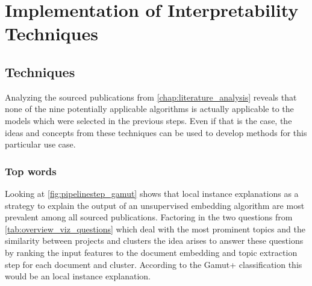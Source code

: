 %
\chapter{Implementation of Interpretability Techniques}
\label{chap:interpretability_techniques}

\section{Techniques}

Analyzing the sourced publications from \autoref{chap:literature_analysis} reveals that none of the nine potentially applicable algorithms is actually applicable to the models which were selected in the previous steps. Even if that is the case, the ideas and concepts from these techniques can be used to develop methods for this particular use case.

\subsection{Top words}

Looking at \autoref{fig:pipelinestep_gamut} shows that local instance explanations as a strategy to explain the output of an unsupervised embedding algorithm are most prevalent among all sourced publications. Factoring in the two questions from \autoref{tab:overview_viz_questions} which deal with the most prominent topics and the similarity between projects and clusters the idea arises to answer these questions by ranking the input features to the document embedding and topic extraction step for each document and cluster. According to the Gamut+ classification this would be an local instance explanation.

